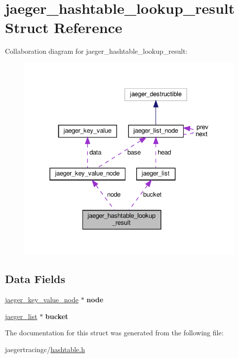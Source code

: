 \hypertarget{structjaeger__hashtable__lookup__result}{}\section{jaeger\+\_\+hashtable\+\_\+lookup\+\_\+result Struct Reference}
\label{structjaeger__hashtable__lookup__result}


Collaboration diagram for jaeger\+\_\+hashtable\+\_\+lookup\+\_\+result\+:\nopagebreak
\begin{figure}[H]
\begin{center}
\leavevmode
\includegraphics[width=331pt]{structjaeger__hashtable__lookup__result__coll__graph}
\end{center}
\end{figure}
\subsection*{Data Fields}
\begin{DoxyCompactItemize}
\item 
\mbox{\label{structjaeger__hashtable__lookup__result_a840c3a7e03d125c18851a69f4334c989}} 
\mbox{\hyperlink{structjaeger__key__value__node}{jaeger\+\_\+key\+\_\+value\+\_\+node}} $\ast$ {\bfseries node}
\item 
\mbox{\label{structjaeger__hashtable__lookup__result_a445935b25b84db16ba06be06638625ee}} 
\mbox{\hyperlink{structjaeger__list}{jaeger\+\_\+list}} $\ast$ {\bfseries bucket}
\end{DoxyCompactItemize}


The documentation for this struct was generated from the following file\+:\begin{DoxyCompactItemize}
\item 
jaegertracingc/\mbox{\hyperlink{hashtable_8h}{hashtable.\+h}}\end{DoxyCompactItemize}
